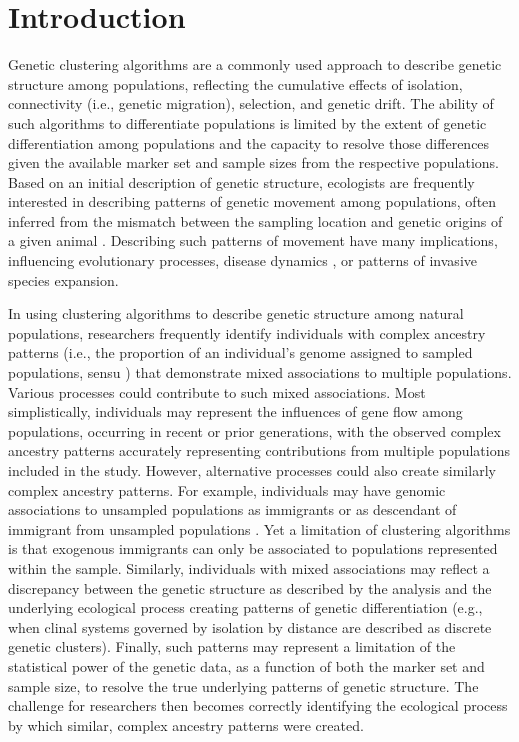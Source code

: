 
\section*{Introduction}

Genetic clustering algorithms are a commonly used approach to describe genetic structure among populations, reflecting the cumulative effects of isolation, connectivity (i.e., genetic migration), selection, and genetic drift.  The ability of such algorithms to differentiate populations is limited by the extent of genetic differentiation among populations and the capacity to resolve those differences given the available marker set and sample sizes from the respective populations.  Based on an initial description of genetic structure, ecologists are frequently interested in describing patterns of genetic movement among populations, often inferred from the mismatch between the sampling location and genetic origins of a given animal \citep{paetkau1995microsatellite,wilson2003bayesian}.  Describing such patterns of movement have many implications, influencing evolutionary processes, disease dynamics \citep{huestis2019windborne}, or patterns of invasive species expansion.

	In using clustering algorithms to describe genetic structure among natural populations, researchers frequently identify individuals with complex ancestry patterns (i.e., the proportion of an individual’s genome assigned to sampled populations, sensu \citealt{pritchard2000inference}) that demonstrate mixed associations to multiple populations.  Various processes could contribute to such mixed associations.  Most simplistically, individuals may represent the influences of gene flow among populations, occurring in recent or prior generations, with the observed complex ancestry patterns accurately representing contributions from multiple populations included in the study.  However, alternative processes could also create similarly complex ancestry patterns.  For example, individuals may have genomic associations to unsampled populations as immigrants or as descendant of immigrant from unsampled populations \citep{pritchard2000inference,beerli2004effect}.  Yet a limitation of clustering algorithms is that exogenous immigrants can only be associated to populations represented within the sample.  Similarly, individuals with mixed associations may reflect a discrepancy between the genetic structure as described by the analysis and the underlying ecological process creating patterns of genetic differentiation (e.g., when clinal systems governed by isolation by distance are described as discrete genetic clusters).  Finally, such patterns may represent a limitation of the statistical power of the genetic data, as a function of both the marker set and sample size, to resolve the true underlying patterns of genetic structure.  The challenge for researchers then becomes correctly identifying the ecological process by which similar, complex ancestry patterns were created.  
	
